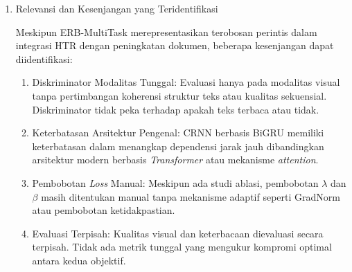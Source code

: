 \documentclass[12pt,a4paper]{article}
\begin{document}
\begin{enumerate}[leftmargin=*, labelindent=0pt, itemsep=1ex, topsep=0pt]
\begin{enumerate}[leftmargin=1.5em, labelsep=0.5em, itemindent=0pt, label=\alph*., topsep=0pt, parsep=0pt, itemsep=0pt]
      \item Integrasi Perintis: Penelitian pertama yang mengintegrasikan pengenal HTR (CRNN) dalam siklus pelatihan GAN untuk peningkatan dokumen tulisan tangan
      \item Evaluasi \textit{Dual-Objective}: Mengadopsi protokol evaluasi simultan untuk kualitas visual (PSNR, FM) dan keterbacaan fungsional (CER, WER)
      \item \textit{Progressive Learning}: Membuktikan bahwa melatih pengenal secara progresif dari domain terdegradasi ke domain bersih lebih efektif
      \item Validasi Multi-Aksara: Demonstrasi efektivitas pada aksara Arab (KHATT) dan Latin (IAM)
      \item \textit{State-of-the-Art} DIBCO: Mencapai SOTA pada H-DIBCO 2016, H-DIBCO 2017, dan H-DIBCO 2018 (setelah \textit{fine-tuning})
\end{enumerate}


\item Relevansi dan Kesenjangan yang Teridentifikasi

Meskipun ERB-MultiTask merepresentasikan terobosan perintis dalam integrasi HTR dengan peningkatan dokumen, beberapa kesenjangan dapat diidentifikasi:

\begin{enumerate}[leftmargin=1.5em, labelsep=0.5em, itemindent=0pt, label=\alph*., topsep=0pt, parsep=0pt, itemsep=0pt]
      \item Diskriminator Modalitas Tunggal: Evaluasi hanya pada modalitas visual tanpa pertimbangan koherensi struktur teks atau kualitas sekuensial. Diskriminator tidak peka terhadap apakah teks terbaca atau tidak.

      \item Keterbatasan Arsitektur Pengenal: CRNN berbasis BiGRU memiliki keterbatasan dalam menangkap dependensi jarak jauh dibandingkan arsitektur modern berbasis \textit{Transformer} atau mekanisme \textit{attention}.

      \item Pembobotan \textit{Loss} Manual: Meskipun ada studi ablasi, pembobotan $\lambda$ dan $\beta$ masih ditentukan manual tanpa mekanisme adaptif seperti GradNorm atau pembobotan ketidakpastian.

      \item Evaluasi Terpisah: Kualitas visual dan keterbacaan dievaluasi secara terpisah. Tidak ada metrik tunggal yang mengukur kompromi optimal antara kedua objektif.
\end{enumerate}

\end{enumerate}
\end{document}
